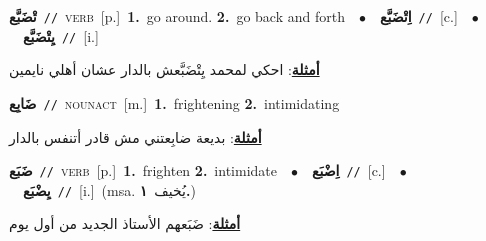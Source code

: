 \documentclass[10pt,a4paper,twoside]{article} %
\begin{document}
\begin{multicols}{2}
{\setlength\topsep{0pt}\textbf{\foreignlanguage{arabic}{تْضَبَّع}}\ {\color{gray}\texttt{//}\color{black}}\ \textsc{verb}\ [p.]\ \textbf{1.}~go around.  \textbf{2.}~go back and forth\ \ $\bullet$\ \ \setlength\topsep{0pt}\textbf{\foreignlanguage{arabic}{اِتْضَبَّع}}\ {\color{gray}\texttt{//}\color{black}}\ [c.]\ \ $\bullet$\ \ \setlength\topsep{0pt}\textbf{\foreignlanguage{arabic}{يِتْضَبَّع}}\ {\color{gray}\texttt{//}\color{black}}\ [i.]\  \begin{flushright}\color{gray}\foreignlanguage{arabic}{\textbf{\underline{\foreignlanguage{arabic}{أمثلة}}}: احكي لمحمد يِتْضَبَّعش بالدار عشان أهلي نايمين}\end{flushright}\color{black}} \vspace{2mm}

{\setlength\topsep{0pt}\textbf{\foreignlanguage{arabic}{ضَابِع}}\ {\color{gray}\texttt{//}\color{black}}\ \textsc{noun\textunderscore act}\ [m.]\ \textbf{1.}~frightening  \textbf{2.}~intimidating\  \begin{flushright}\color{gray}\foreignlanguage{arabic}{\textbf{\underline{\foreignlanguage{arabic}{أمثلة}}}: بديعة ضابِعتني مش قادر أتنفس بالدار}\end{flushright}\color{black}} \vspace{2mm}

{\setlength\topsep{0pt}\textbf{\foreignlanguage{arabic}{ضَبَع}}\ {\color{gray}\texttt{//}\color{black}}\ \textsc{verb}\ [p.]\ \textbf{1.}~frighten  \textbf{2.}~intimidate\ \ $\bullet$\ \ \setlength\topsep{0pt}\textbf{\foreignlanguage{arabic}{اِضْبَع}}\ {\color{gray}\texttt{//}\color{black}}\ [c.]\ \ $\bullet$\ \ \setlength\topsep{0pt}\textbf{\foreignlanguage{arabic}{يِضْبَع}}\ {\color{gray}\texttt{//}\color{black}}\ [i.]\ \color{gray}(msa. \foreignlanguage{arabic}{يُخيف}~\foreignlanguage{arabic}{\textbf{١.}})\color{black}\  \begin{flushright}\color{gray}\foreignlanguage{arabic}{\textbf{\underline{\foreignlanguage{arabic}{أمثلة}}}: ضَبَعهم الأستاذ الجديد من أول يوم}\end{flushright}\color{black}} \vspace{2mm}


\end{multicols}
\end{document}
